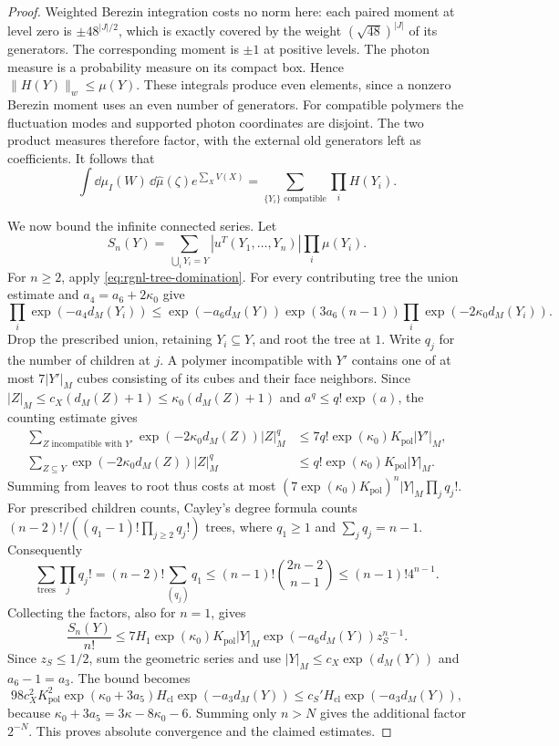 \begin{proof}
Weighted Berezin integration costs no norm here:
each paired moment at level zero is
$\pm48^{|J|/2}$, which is exactly covered by the
weight $(\sqrt{48})^{|J|}$ of its generators.
The corresponding moment is $\pm1$ at positive levels.
The photon measure is a probability measure on its compact
box. Hence $\|H(Y)\|_w\le\mu(Y)$.
These integrals produce even elements, since a nonzero
Berezin moment uses an even number of generators.
For compatible polymers the fluctuation modes and
supported photon coordinates are disjoint. The two
product measures therefore factor, with the external
old generators left as coefficients. It follows that
\begin{equation}\label{eq:rgnl-compatible-partition}
 \int\dd\mu_I(W)\,\dd\widehat\mu(\zeta)e^{\sum_XV(X)}
             =\sum_{\{Y_i\}\text{ compatible}}\prod_iH(Y_i).
\end{equation}

We now bound the infinite connected series. Let
\[
 S_n(Y)=\sum_{\bigcup_iY_i=Y}
                   |u^T(Y_1,\ldots,Y_n)|\prod_i\mu(Y_i).
\]
For $n\ge2$, apply \eqref{eq:rgnl-tree-domination}.
For every contributing tree the union estimate and
$a_4=a_6+2\kappa_0$ give
\[
 \prod_i \exp(-a_4d_M(Y_i))
 \le \exp(-a_6d_M(Y))\exp(3a_6(n-1))
                                  \prod_i \exp(-2\kappa_0d_M(Y_i)).
\]
Drop the prescribed union, retaining $Y_i\subseteq Y$,
and root the tree at $1$. Write $q_j$ for the number
of children at $j$. A polymer incompatible with $Y'$
contains one of at most $7|Y'|_M$ cubes consisting of
its cubes and their face neighbors. Since
$|Z|_M\le c_X(d_M(Z)+1)\le\kappa_0(d_M(Z)+1)$ and
$a^q\le q!\exp(a)$, the counting estimate gives
\begin{align*}
 \sum_{Z\text{ incompatible with }Y'}
      \exp(-2\kappa_0d_M(Z))|Z|_M^{q}
            &\le7q!\exp(\kappa_0)K_{\mathrm{pol}}|Y'|_M,\\
 \sum_{Z\subseteq Y}\exp(-2\kappa_0d_M(Z))|Z|_M^q
            &\le q!\exp(\kappa_0)K_{\mathrm{pol}}|Y|_M.
\end{align*}
Summing from leaves to root thus costs at most
$(7\exp(\kappa_0)K_{\mathrm{pol}})^n|Y|_M\prod_jq_j!$.
For prescribed children counts, Cayley's degree formula
\cite[Proposition~4]{PostnikovLin2019}
counts
$(n-2)!/((q_1-1)!\prod_{j\ge2}q_j!)$ trees, where
$q_1\ge1$ and $\sum_jq_j=n-1$.
Consequently
\[
 \sum_{\text{trees}}\prod_jq_j!
   =(n-2)!\sum_{(q_j)}q_1
   \le(n-1)!\binom{2n-2}{n-1}
   \le(n-1)!4^{n-1}.
\]
Collecting the factors, also for $n=1$, gives
\begin{equation}\label{eq:rgnl-connected-n-bound}
 \frac{S_n(Y)}{n!}
 \le7H_1\exp(\kappa_0)K_{\mathrm{pol}}|Y|_M
                                      \exp(-a_6d_M(Y))z_S^{n-1}.
\end{equation}
Since $z_S\le1/2$, sum the geometric series and use
$|Y|_M\le c_X\exp(d_M(Y))$ and $a_6-1=a_3$.
The bound becomes
\[
 98c_X^2K_{\mathrm{pol}}^2\exp(\kappa_0+3a_5)
                                 H_{\mathrm{cl}}\exp(-a_3d_M(Y))
 \le c_S'H_{\mathrm{cl}}\exp(-a_3d_M(Y)),
\]
because $\kappa_0+3a_5=3\kappa-8\kappa_0-6$.
Summing only $n>N$ gives the additional factor $2^{-N}$.
This proves absolute convergence and the claimed estimates.


\end{proof}
